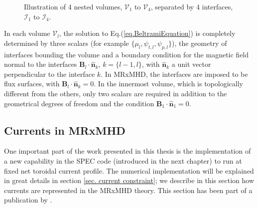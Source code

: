 \documentclass[my_thesis.tex]{subfiles}
\begin{document}
\begin{figure}
	\centering
	\caption{Illustration of 4 nested volumes, $\mathcal{V}_1$ to $\mathcal{V}_4$, separated by 4 interfaces, $\mathcal{I}_1$ to $\mathcal{I}_4$.}
	\label{fig:Illustration_SPEC}
\end{figure}

In each volume $\mathcal{V}_l$, the solution to Eq.(\ref{eq.BeltramiEquation}) is completely determined by three scalars (for example $\{\mu_l,\psi_{t,l},\psi_{p,l}\}$), the geometry of interfaces bounding the volume and a boundary condition for the magnetic field normal to the interfaces $\mathbf{B}_l\cdot\hat{\mathbf{n}}_k$, $k=\{l-1,l\}$, with $\hat{\mathbf{n}}_k$ a unit vector perpendicular to the interface $k$. In \ac{MRxMHD}, the interfaces are imposed to be flux surfaces, with $\mathbf{B}_l\cdot\hat{\mathbf{n}}_k=0$. In the innermost volume, which is topologically different from the others, only two scalars are required in addition to the geometrical degrees of freedom and the condition $\mathbf{B}_1\cdot\hat{\mathbf{n}}_1=0$.



\subsection{Currents in MRxMHD}
One important part of the work presented in this thesis is the implementation of a new capability in the SPEC code (introduced in the next chapter) to run at fixed net toroidal current profile. The numerical implementation will be explained in great details in section \ref{sec. current constraint}; we describe in this section how currents are represented in the MRxMHD theory. This section has been part of a publication by \citet{Baillod2021}.
\end{document}
